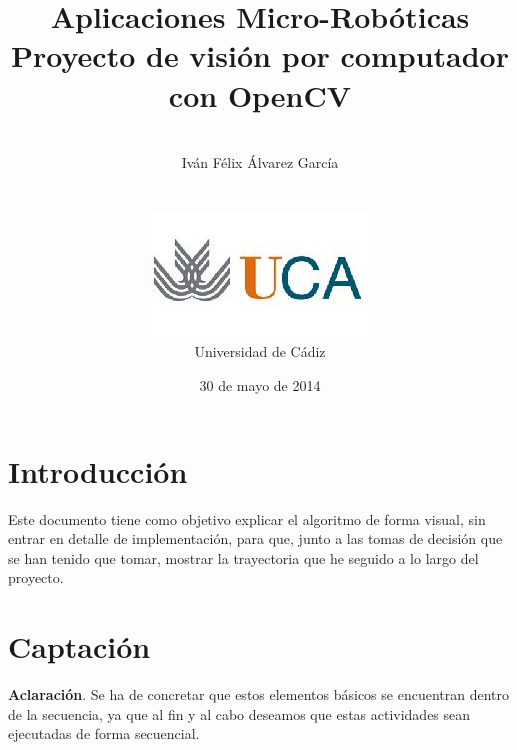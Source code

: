 \documentclass[11pt]{article}
\title{\textbf{Aplicaciones Micro-Robóticas\\
		       Proyecto de visión por computador con OpenCV}}
\author{\\Iván Félix Álvarez García\\\\\\
		\includegraphics[scale=0.45]{logo_uca}\\
		Universidad de Cádiz}
\date{30 de mayo de 2014}
\begin{document}
\maketitle
\newpage

\section{Introducción}

Este documento tiene como objetivo explicar el algoritmo de forma visual, sin entrar en detalle de implementación, para que, junto a las tomas de decisión que se han tenido que tomar, mostrar la trayectoria que he seguido a lo largo del proyecto.

\section{Captación}


\begin{shaded}
\textbf{Aclaración}. Se ha de concretar que estos elementos básicos se encuentran dentro de la secuencia, ya que al fin y al cabo deseamos que estas actividades sean ejecutadas de forma secuencial.
\end{shaded}
\end{document}
